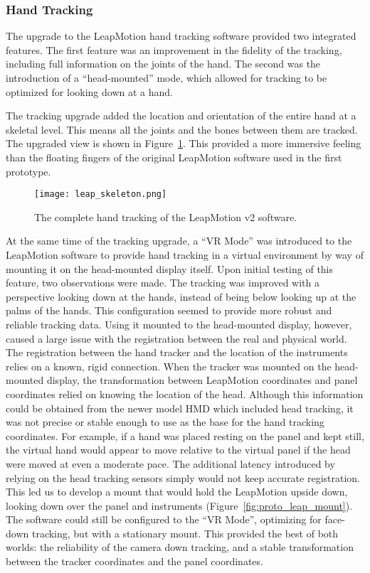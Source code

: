 \subsubsection{Hand Tracking}
\label{sec:proto-hand-tracking}

The upgrade to the LeapMotion hand tracking software provided two integrated features.
The first feature was an improvement in the fidelity of the tracking, including full information on the joints of the hand.
The second was the introduction of a ``head-mounted'' mode, which allowed for tracking to be optimized for looking down at a hand.

The tracking upgrade added the location and orientation of the entire hand at a skeletal level.
This means all the joints and the bones between them are tracked.
The upgraded view is shown in Figure~\ref{fig:proto_skeleton}.
This provided a more immersive feeling than the floating fingers of the original LeapMotion software used in the first prototype.

\begin{figure}
    \centering
    \texttt{[image: leap\_skeleton.png]}
    \caption{The complete hand tracking of the LeapMotion v2 software.}
    \label{fig:proto_skeleton}
\end{figure}

At the same time of the tracking upgrade, a ``VR Mode'' was introduced to the LeapMotion software to provide hand tracking in a virtual environment by way of mounting it on the head-mounted display itself.
Upon initial testing of this feature, two observations were made.
The tracking was improved with a perspective looking down at the hands, instead of being below looking up at the palms of the hands.
This configuration seemed to provide more robust and reliable tracking data.
Using it mounted to the head-mounted display, however, caused a large issue with the registration between the real and physical world.
The registration between the hand tracker and the location of the instruments relies on a known, rigid connection.
When the tracker was mounted on the head-mounted display, the transformation between LeapMotion coordinates and panel coordinates relied on knowing the location of the head.
Although this information could be obtained from the newer model HMD which included head tracking, it was not precise or stable enough to use as the base for the hand tracking coordinates.
For example, if a hand was placed resting on the panel and kept still, the virtual hand would appear to move relative to the virtual panel if the head were moved at even a moderate pace.
The additional latency introduced by relying on the head tracking sensors simply would not keep accurate registration.
This led us to develop a mount that would hold the LeapMotion upside down, looking down over the panel and instruments (Figure~\ref{fig:proto_leap_mount}).
The software could still be configured to the ``VR Mode'', optimizing for face-down tracking, but with a stationary mount.
This provided the best of both worlds: the reliability of the camera down tracking, and a stable transformation between the tracker coordinates and the panel coordinates.

